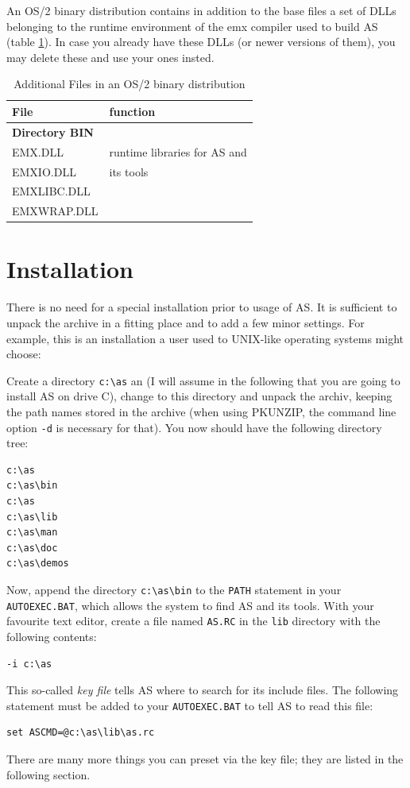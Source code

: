 \documentclass[12pt,twoside]{report}
\newcommand{\tty}[1]{{\tt #1}}
\newcommand{\asname}{{AS}}
\begin{document}
An OS/2 binary distribution  contains in addition to
the base files a set of DLLs belonging to the runtime environment of the
emx compiler used to build \asname{} (table \ref{TabOS2PackageList}).  In case
you already have these DLLs (or newer versions of them), you may delete
these and use your ones insted.

\begin{table}[htp]
\begin{center}\begin{tabular}{|l|l|}
\hline
File              & function \\
\hline
\hline
{\bf Directory BIN} & \\
\hline
EMX.DLL           & runtime libraries for \asname{} and \\
EMXIO.DLL         & its tools \\
EMXLIBC.DLL       & \\
EMXWRAP.DLL       & \\
\hline
\end{tabular}\end{center}
\caption{Additional Files in an OS/2 binary distribution
         \label{TabOS2PackageList}}
\end{table}


\section{Installation}

There is no need for a  special installation prior to
usage of \asname{}.  It is sufficient to unpack the archive in a fitting place
and to add a few minor settings.  For example, this is an installation a
user used to UNIX-like operating systems might choose:

Create a directory \verb!c:\as! an (I will assume in the following that
you are going to install \asname{} on drive C), change to this directory and
unpack the archiv, keeping the path names stored in the archive (when
using PKUNZIP, the command line option \verb!-d! is necessary for that).
You now should have the following directory tree:
\begin{verbatim}
c:\as
c:\as\bin
c:\as
c:\as\lib
c:\as\man
c:\as\doc
c:\as\demos
\end{verbatim}
Now, append the directory \verb!c:\as\bin! to the \tty{PATH} statement in
your \tty{AUTOEXEC.BAT}, which allows the system to find \asname{} and its tools.
With your favourite text editor, create a file named \tty{AS.RC} in the
\tty{lib} directory with the following contents:
\begin{verbatim}
-i c:\as
\end{verbatim}
This so-called {\em key file} tells \asname{} where to search for its include
files.  The following statement must be added to your \tty{AUTOEXEC.BAT}
to tell \asname{} to read this file:
\begin{verbatim}
set ASCMD=@c:\as\lib\as.rc
\end{verbatim}
There are many more things you can preset via the key file; they are
listed in the following section.
\end{document}
